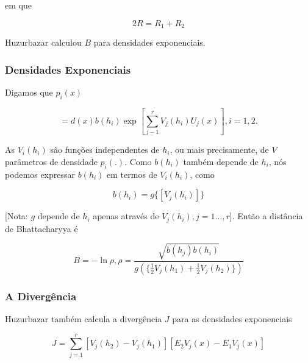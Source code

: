 \documentclass{sbrt2017port}
\begin{document}
em que

\begin{equation}
	2R = R_1 + R_2
	\label{eq62}
\end{equation}

Huzurbazar \cite{r30} calculou $B$ para densidades exponenciais.

\subsubsection{Densidades Exponenciais}

Digamos que $p_i(x)$

\begin{equation}
	 = d(x)b(h_i) \exp{[\sum_{j-1}^{r} V_j(h_i)U_j(x)]}, i = 1,2.
	\label{eq63}
\end{equation}

As $V_i(h_i)$ são funções independentes de $h_i$, ou mais precisamente, de $V$ parâmetros de densidade $p_i(.)$. Como $b(h_i)$ também depende de $h_i$, nós podemos expressar $b(h_i)$ em termos de $V_i(h_i)$, como

\begin{equation}
	b(h_i) = g\{ [V_j(h_i)] \}
	\label{eq64}
\end{equation}

[Nota: $g$ depende de $h_i$ apenas através de $V_j(h_i), j = 1...,r$]. Então a distância de Bhattacharyya é

\begin{equation}
	B = - \ln \rho, \rho = \frac{\sqrt{b(h_j)b(h_i)}}{g (\{\frac{1}{2}V_j(h_1) +\frac{1}{2}V_j(h_2) \})}
	\label{eq65}
\end{equation}

\subsubsection{A Divergência}

Huzurbazar \cite{r30} também calcula a divergência $J$ para as densidades exponenciais

\begin{equation}
	J = \sum_{j = 1}^{r} [V_j(h_2)-V_j(h_1)][E_2V_j(x)-E_1V_j(x)]
	\label{eq66}
\end{equation}
\end{document}
